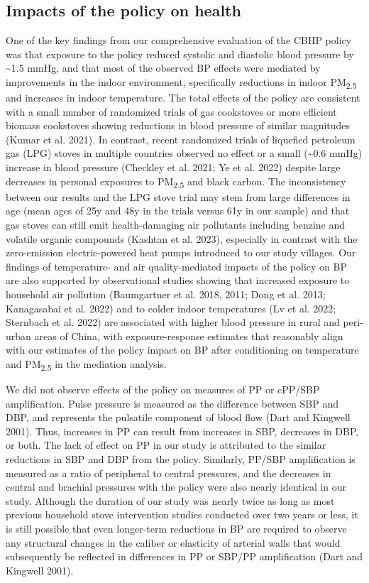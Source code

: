 \documentclass[
  letterpaper,
  DIV=11,
  numbers=noendperiod]{scrartcl}
\begin{document}
\subsection{Impacts of the policy on
health}\label{impacts-of-the-policy-on-health}

One of the key findings from our comprehensive evaluation of the CBHP
policy was that exposure to the policy reduced systolic and diastolic
blood pressure by \textasciitilde1.5 mmHg, and that most of the observed
BP effects were mediated by improvements in the indoor environment,
specifically reductions in indoor PM\textsubscript{2.5} and increases in
indoor temperature. The total effects of the policy are consistent with
a small number of randomized trials of gas cookstoves or more efficient
biomass cookstoves showing reductions in blood pressure of similar
magnitudes (Kumar et al. 2021). In contrast, recent randomized trials of
liquefied petroleum gas (LPG) stoves in multiple countries observed no
effect or a small (\textasciitilde0.6 mmHg) increase in blood pressure
(Checkley et al. 2021; Ye et al. 2022) despite large decreases in
personal exposures to PM\textsubscript{2.5} and black carbon. The
inconsistency between our results and the LPG stove trial may stem from
large differences in age (mean ages of 25y and 48y in the trials versus
61y in our sample) and that gas stoves can still emit health-damaging
air pollutants including benzine and volatile organic compounds (Kashtan
et al. 2023), especially in contrast with the zero-emission
electric-powered heat pumps introduced to our study villages. Our
findings of temperature- and air quality-mediated impacts of the policy
on BP are also supported by observational studies showing that increased
exposure to household air pollution (Baumgartner et al. 2018, 2011; Dong
et al. 2013; Kanagasabai et al. 2022) and to colder indoor temperatures
(Lv et al. 2022; Sternbach et al. 2022) are associated with higher blood
pressure in rural and peri-urban areas of China, with exposure-response
estimates that reasonably align with our estimates of the policy impact
on BP after conditioning on temperature and PM\textsubscript{2.5} in the
mediation analysis.

We did not observe effects of the policy on measures of PP or cPP/SBP
amplification. Pulse pressure is measured as the difference between SBP
and DBP, and represents the pulsatile component of blood flow (Dart and
Kingwell 2001). Thus, increases in PP can result from increases in SBP,
decreases in DBP, or both. The lack of effect on PP in our study is
attributed to the similar reductions in SBP and DBP from the policy.
Similarly, PP/SBP amplification is measured as a ratio of peripheral to
central pressures, and the decreases in central and brachial pressures
with the policy were also nearly identical in our study. Although the
duration of our study was nearly twice as long as most previous
household stove intervention studies conducted over two years or less,
it is still possible that even longer-term reductions in BP are required
to observe any structural changes in the caliber or elasticity of
arterial walls that would subsequently be reflected in differences in PP
or SBP/PP amplification (Dart and Kingwell 2001).
\end{document}
